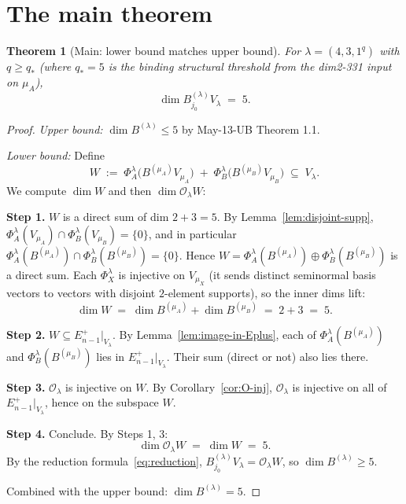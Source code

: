\documentclass[11pt]{article}
\newtheorem{theorem}{Theorem}
\theoremstyle{definition}
\begin{document}
\section{The main theorem}\label{sec:main}

\begin{theorem}[Main: lower bound matches upper bound]\label{thm:main}
For $\lambda = (4, 3, 1^q)$ with $q \ge q_*$ (where $q_* = 5$ is the
binding structural threshold from the dim2-331 input on $\mu_A$),
\begin{equation}\label{eq:main}
   \dim B^{(\lambda)}_{j_0} V_\lambda \;=\; 5.
\end{equation}
\end{theorem}

\begin{proof}
\emph{Upper bound:} $\dim B^{(\lambda)} \le 5$ by May-13-UB
Theorem 1.1.

\emph{Lower bound:} Define
\[
   W \;:=\; \Phi_A^\lambda\!\big(B^{(\mu_A)} V_{\mu_A}\big)
      \;+\;
      \Phi_B^\lambda\!\big(B^{(\mu_B)} V_{\mu_B}\big)
   \;\subseteq\; V_\lambda.
\]
We compute $\dim W$ and then $\dim \mathcal{O}_\lambda W$:

\textbf{Step 1.} $W$ is a direct sum of dim $2 + 3 = 5$.
By Lemma~\ref{lem:disjoint-supp},
$\Phi_A^\lambda(V_{\mu_A}) \cap \Phi_B^\lambda(V_{\mu_B}) = \{0\}$,
and in particular
$\Phi_A^\lambda(B^{(\mu_A)}) \cap \Phi_B^\lambda(B^{(\mu_B)}) = \{0\}$.
Hence $W = \Phi_A^\lambda(B^{(\mu_A)}) \oplus \Phi_B^\lambda(B^{(\mu_B)})$
is a direct sum. Each $\Phi_X^\lambda$ is injective on $V_{\mu_X}$
(it sends distinct seminormal basis vectors to vectors with disjoint
$2$-element supports), so the inner dims lift:
\[
   \dim W \;=\; \dim B^{(\mu_A)} + \dim B^{(\mu_B)} \;=\; 2 + 3 \;=\; 5.
\]

\textbf{Step 2.} $W \subseteq E_{n-1}^+|_{V_\lambda}$.
By Lemma~\ref{lem:image-in-Eplus}, each of
$\Phi_A^\lambda(B^{(\mu_A)})$ and $\Phi_B^\lambda(B^{(\mu_B)})$ lies in
$E_{n-1}^+|_{V_\lambda}$. Their sum (direct or not) also lies there.

\textbf{Step 3.} $\mathcal{O}_\lambda$ is injective on $W$.
By Corollary~\ref{cor:O-inj}, $\mathcal{O}_\lambda$ is injective on
all of $E_{n-1}^+|_{V_\lambda}$, hence on the subspace $W$.

\textbf{Step 4.} Conclude. By Steps 1, 3:
\[
   \dim \mathcal{O}_\lambda W \;=\; \dim W \;=\; 5.
\]
By the reduction formula~\eqref{eq:reduction},
$B^{(\lambda)}_{j_0} V_\lambda = \mathcal{O}_\lambda W$, so
$\dim B^{(\lambda)} \ge 5$.

Combined with the upper bound: $\dim B^{(\lambda)} = 5$.
\end{proof}
\end{document}
